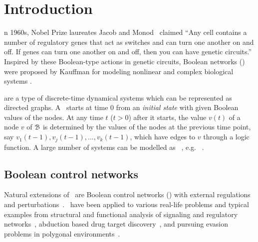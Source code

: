 

\section{Introduction}
\label{sec:intro}


n 1960s, Nobel Prize laureates Jacob and Monod~\cite{Jacob1961Genetic} claimed ``Any cell contains a number of regulatory genes that act as switches and can turn one another on and off. If genes can turn one another on and off, then you can have genetic circuits.'' Inspired by these Boolean-type actions in genetic circuits, Boolean networks (\BNs) were proposed by Kauffman for modeling nonlinear and complex biological systems \cite{Kauffman1968Metabolic}. 

{\BNs} are a type of discrete-time dynamical systems which can be represented as directed graphs. A \BN\ starts at time $0$ from an {\em initial state} with given Boolean values of the nodes. At any time $t$ ($t> 0$) after it starts, the value $v(t)$ of a node $v$ of ${\mathcal{B}}$ is determined by the values of the nodes at the previous time point, say $v_{1}(t-1),v_{j}(t-1),\ldots,v_k(t-1)$, which have edges to $v$ through a logic function. A large number of systems can be modelled as \BNs ~\cite{Kauffman1968Metabolic}, e.g. ~\cite{Akutsu2000Inferring, Shmulevich2002From, Faur2006Dynamical,Green2007The,Lou2010Multi}.

\subsection{Boolean control networks}
Natural extensions of \BNs\ are Boolean control networks (\BCNs) with external regulations and perturbations~\cite{Ideker2001A}. \BCNs\ have been applied to  various real-life problems %
and typical examples from  structural and functional analysis of signaling and regulatory networks~\cite{Kaufman1999A, Klamt2006A}, 
abduction based drug target discovery~\cite{Biane2017Abduction}, 
and pursuing evasion problems in polygonal environments~\cite{Thunberg2011A}.
%


